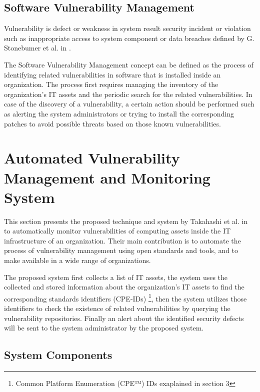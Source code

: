 \documentclass{llncs}
\begin{document}
         
\subsection{Software Vulnerability Management}

\par Vulnerability is defect or weakness in system result security incident or violation such as inappropriate access to system component or data breaches defined by G. Stonebumer et al. in \cite{vuln}.  

\par The Software Vulnerability Management concept can be defined as the process of identifying related vulnerabilities in software that is installed inside an organization. The process first requires managing the inventory of the organization's IT assets and the periodic search for the related vulnerabilities. In case of the discovery of a vulnerability, a certain action should be performed such as alerting the system administrators or trying to install the corresponding patches to avoid possible threats based on those known vulnerabilities. 



   
\section{Automated Vulnerability Management and Monitoring System}

\par This section presents the proposed technique and system by Takahashi et al. in \cite{paper1} to automatically monitor vulnerabilities of computing assets inside the IT infrastructure of an organization. Their main contribution is to automate the process of vulnerability management using open standards and tools, and to make available in a wide range of organizations.
\par
 The proposed system first collects a list of IT assets, the system uses the collected and stored information about the organization's IT assets to find the corresponding standards identifiers (CPE-IDs) \footnote{ Common Platform Enumeration (CPE™) IDs exaplained in section 3}, then the system utilizes those identifiers to check the existence of related vulnerabilities by querying the vulnerability repositories. Finally an alert about the identified security defects will be sent to the system administrator by the proposed system.
    
\subsection{System Components}
\end{document}
